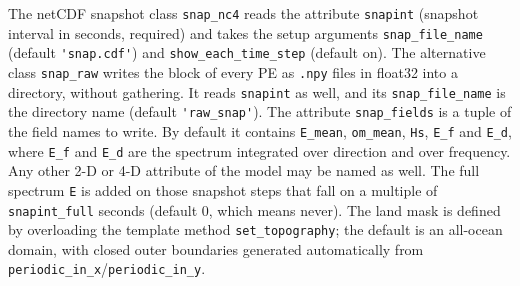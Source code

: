 \documentclass[12pt]{article}
\begin{document}
The netCDF snapshot class \verb|snap_nc4| reads the attribute \verb|snapint| (snapshot
interval in seconds, required) and takes the setup arguments
\verb|snap_file_name| (default \verb|'snap.cdf'|) and
\verb|show_each_time_step| (default on).
The alternative class \verb|snap_raw| writes the block of every PE as
\verb|.npy| files in float32 into a directory, without gathering.
It reads \verb|snapint| as well, and its \verb|snap_file_name| is the
directory name (default \verb|'raw_snap'|).
The attribute \verb|snap_fields| is a tuple of the field names to write.
By default it contains \verb|E_mean|, \verb|om_mean|, \verb|Hs|,
\verb|E_f| and \verb|E_d|, where \verb|E_f| and \verb|E_d| are the spectrum
integrated over direction and over frequency.
Any other 2-D or 4-D attribute of the model may be named as well.
The full spectrum \verb|E| is added on those snapshot steps that fall on a
multiple of \verb|snapint_full| seconds (default 0, which means never). The land mask is defined by
overloading the template method \verb|set_topography|; the default is an
all-ocean domain, with closed outer boundaries generated automatically from
\verb|periodic_in_x|/\verb|periodic_in_y|.
\end{document}
